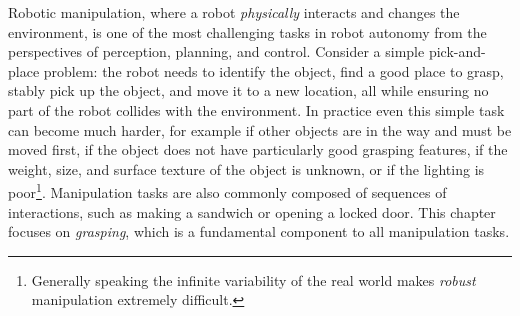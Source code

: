 Robotic manipulation, where a robot \textit{physically} interacts and changes the environment, is one of the most challenging tasks in robot autonomy from the perspectives of perception, planning, and control. Consider a simple pick-and-place problem: the robot needs to identify the object, find a good place to grasp, stably pick up the object, and move it to a new location, all while ensuring no part of the robot collides with the environment. In practice even this simple task can become much harder, for example if other objects are in the way and must be moved first, if the object does not have particularly good grasping features, if the weight, size, and surface texture of the object is unknown, or if the lighting is poor\footnote{Generally speaking the infinite variability of the real world makes \textit{robust} manipulation extremely difficult.}. Manipulation tasks are also commonly composed of sequences of interactions, such as making a sandwich or opening a locked door. This chapter focuses on \textit{grasping}\cite{PrattichizzoTrinkle2016}, which is a fundamental component to all manipulation tasks.

